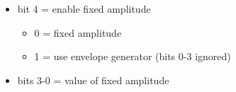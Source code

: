 \begin{itemize}
\item bit 4 = enable fixed amplitude
  \begin{itemize}
  \item 0 = fixed amplitude
  \item 1 = use envelope generator (bits 0-3 ignored)
  \end{itemize}
\item bits 3-0 = value of fixed amplitude
\end{itemize}

